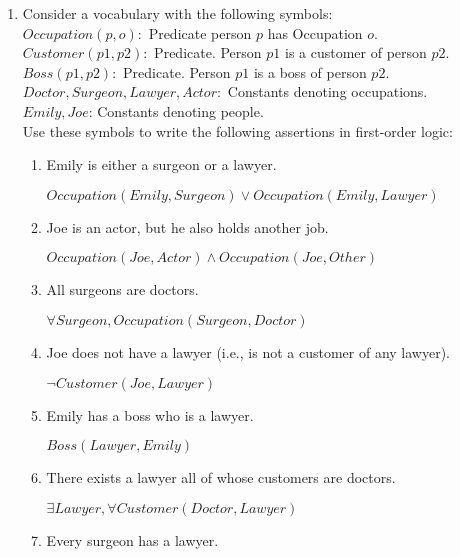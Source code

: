 \documentclass[paper=a4, fontsize=11pt]{scrartcl} %
\numberwithin{equation}{section} %
\numberwithin{figure}{section} %
\numberwithin{table}{section} %
\begin{document}
\begin{enumerate}
	\item
	Consider a vocabulary with the following symbols:\\

	$Occupation(p, o):$ Predicate person $p$ has Occupation $o$.\\
	$Customer (p1, p2):$ Predicate. Person $p1$ is a customer of person $p2$.\\
	$Boss (p1, p2):$ Predicate. Person $p1$ is a boss of person $p2$.\\
	$Doctor, Surgeon, Lawyer, Actor:$ Constants denoting occupations.\\
	$Emily, Joe$: Constants denoting people.\\
	
	Use these symbols to write the following assertions in first-order logic:
	\begin{enumerate}
		\item
		Emily is either a surgeon or a lawyer.

		$Occupation(Emily, Surgeon) \vee Occupation(Emily, Lawyer)$\\
		
		\item
		Joe is an actor, but he also holds another job.

		$Occupation(Joe, Actor) \wedge Occupation(Joe, Other)$\\
		
		\item
		All surgeons are doctors.

		$\forall Surgeon, Occupation(Surgeon, Doctor)$\\
		
		\item
		Joe does not have a lawyer (i.e., is not a customer of any lawyer).

		$\neg Customer(Joe, Lawyer)$\\
		
		\item
		Emily has a boss who is a lawyer.

		$Boss(Lawyer, Emily)$\\
		
		\item
		There exists a lawyer all of whose customers are doctors.

		$\exists Lawyer, \forall Customer(Doctor, Lawyer)$\\
		
		\item
		Every surgeon has a lawyer.


\end{enumerate}
\end{enumerate}
\end{document}
